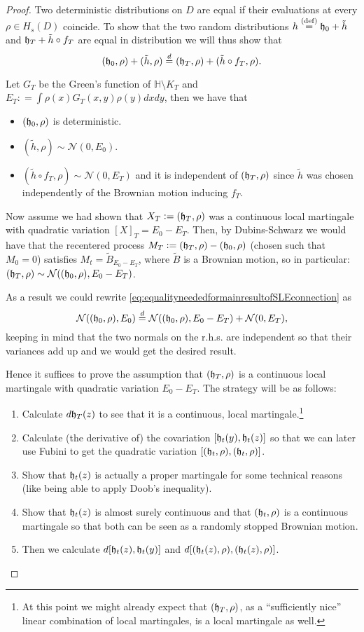 \documentclass[11pt,reqno]{amsart}
\numberwithin{equation}{section}
\newcommand{\eqby}[1]{\mathrel{\stackrel{#1}{=}}}
\newcommand{\eqbydef}{\mathrel{\stackrel{\text{(def)}}{=}}}
\newcommand{\deq}{\mathrel{\mathop:}=}
\newcommand{\fh}{{\frak h}}
\begin{document}
\begin{proof}
	Two deterministic distributions on $D$ are equal if their evaluations at every $\rho\in H_s(D)$ coincide. To show that the two random distributions $h\eqbydef \fh_0+\tilde h$ and $\fh_T+\tilde h\circ f_T$ are equal in distribution we will thus show that \begin{equation}\label{eq:equalityneededformainresultofSLEconnection}
			(\fh_0,\rho)+(\tilde h,\rho)\eqby{d}(\fh_T,\rho)+(\tilde h\circ f_T,\rho).
		\end{equation}
	
	Let $G_T$ be the Green's function of $\mathbb H\setminus K_T$ and $E_T\deq\int \rho(x)G_T(x,y)\rho(y)dxdy$, then we have that
	\begin{itemize}
		\item $(\fh_0,\rho)$ is deterministic.
		\item $(\tilde h,\rho)\sim\mathcal N(0,E_0)$.
		\item $(\tilde h\circ f_T,\rho)\sim\mathcal N(0,E_T)$ and it is independent of $(\fh_T,\rho)$ since $\tilde h$ was chosen independently of the Brownian motion inducing $f_T$.
	\end{itemize}
	Now assume we had shown that $X_T\deq(\fh_T,\rho)$ was a continuous local martingale with quadratic variation $[X]_T=E_0-E_T$. Then, by Dubins-Schwarz we would have that the recentered process $M_T\deq(\fh_T,\rho)-(\fh_0,\rho)$ (chosen such that $M_0=0$) satisfies $M_t=\tilde B_{E_0-E_T}$, where $\tilde B$ is a Brownian motion, so in particular: $(\fh_T,\rho)\sim\mathcal N((\fh_0,\rho),E_0-E_T)$.
	
	As a result we could rewrite \eqref{eq:equalityneededformainresultofSLEconnection} as $$\mathcal N((\fh_0,\rho),E_0)\eqby{d}\mathcal N((\fh_0,\rho),E_0-E_T)+\mathcal N(0,E_T),$$
	keeping in mind that the two normals on the r.h.s. are independent so that their variances add up and we would get the desired result.
	
	Hence it suffices to prove the assumption that $(\fh_T,\rho)$ is a continuous local martingale with quadratic variation $E_0-E_T$. The strategy will be as follows:
	\begin{enumerate}
		\item Calculate $d\fh_T(z)$ to see that it is a continuous, local martingale.\footnote{At this point we might already expect that $(\fh_T,\rho)$, as a ``sufficiently nice'' linear combination of local martingales, is a local martingale as well.}
		\item Calculate (the derivative of) the covariation $[\fh_t(y),\fh_t(z)]$ so that we can later use Fubini to get the quadratic variation $[(\fh_t,\rho),(\fh_t,\rho)]$.
		\item Show that $\fh_t(z)$ is actually a proper martingale for some technical reasons (like being able to apply Doob's inequality).
		\item Show that $\fh_t(z)$ is almost surely continuous and that $(\fh_t,\rho)$ is a continuous martingale so that both can be seen as a randomly stopped Brownian motion.
		\item Then we calculate $d[\fh_t(z),\fh_t(y)]$ and $d[(\fh_t(z),\rho),(\fh_t(z),\rho)]$.
	\end{enumerate}
	

\end{proof}
\end{document}
